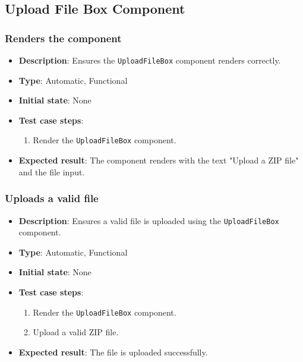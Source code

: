\documentclass[12pt, titlepage]{article}
\begin{document}
\subsection{Upload File Box Component}
\subsubsection{Renders the component}
\begin{itemize}
    \item \textbf{Description}: Ensures the \texttt{UploadFileBox} component renders correctly.
    \item \textbf{Type}: Automatic, Functional
    \item \textbf{Initial state}: None
    \item \textbf{Test case steps}:
    \begin{enumerate}
        \item Render the \texttt{UploadFileBox} component.
    \end{enumerate}
    \item \textbf{Expected result}: The component renders with the text "Upload a ZIP file" and the file input.
\end{itemize}

\subsubsection{Uploads a valid file}
\begin{itemize}
    \item \textbf{Description}: Ensures a valid file is uploaded using the \texttt{UploadFileBox} component.
    \item \textbf{Type}: Automatic, Functional
    \item \textbf{Initial state}: None
    \item \textbf{Test case steps}:
    \begin{enumerate}
        \item Render the \texttt{UploadFileBox} component.
        \item Upload a valid ZIP file.
    \end{enumerate}
    \item \textbf{Expected result}: The file is uploaded successfully.
\end{itemize}
\end{document}
